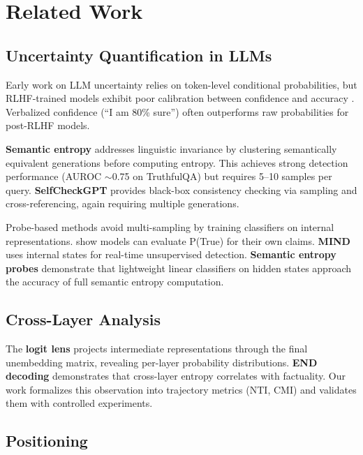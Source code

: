 \section{Related Work}

\subsection{Uncertainty Quantification in LLMs}

Early work on LLM uncertainty relies on token-level conditional probabilities, but RLHF-trained models exhibit poor calibration between confidence and accuracy \citep{tian2023just}. Verbalized confidence (``I am 80\% sure'') often outperforms raw probabilities for post-RLHF models.

\textbf{Semantic entropy} \citep{kuhn2023semantic} addresses linguistic invariance by clustering semantically equivalent generations before computing entropy. This achieves strong detection performance (AUROC $\sim$0.75 on TruthfulQA) but requires 5--10 samples per query. \textbf{SelfCheckGPT} \citep{manakul2023selfcheckgpt} provides black-box consistency checking via sampling and cross-referencing, again requiring multiple generations.

Probe-based methods avoid multi-sampling by training classifiers on internal representations. \citet{kadavath2022language} show models can evaluate P(True) for their own claims. \textbf{MIND} \citep{su2024mind} uses internal states for real-time unsupervised detection. \textbf{Semantic entropy probes} \citep{kossen2024semantic} demonstrate that lightweight linear classifiers on hidden states approach the accuracy of full semantic entropy computation.

\subsection{Cross-Layer Analysis}

The \textbf{logit lens} \citep{nostalgebraist2020logitlens} projects intermediate representations through the final unembedding matrix, revealing per-layer probability distributions. \textbf{END decoding} \citep{wu2025end} demonstrates that cross-layer entropy correlates with factuality. Our work formalizes this observation into trajectory metrics (NTI, CMI) and validates them with controlled experiments.

\subsection{Positioning}

